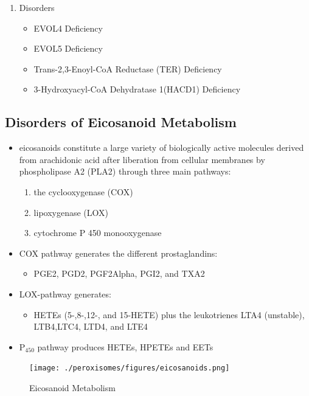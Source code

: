 \documentclass{scrartcl}
\begin{document}
\begin{enumerate}
\item Disorders
\label{sec:orgbee8424}
\begin{itemize}
\item EVOL4 Deficiency
\item EVOL5 Deficiency
\item Trans-2,3-Enoyl-CoA Reductase (TER) Deficiency
\item 3-Hydroxyacyl-CoA Dehydratase 1(HACD1) Deficiency
\end{itemize}
\end{enumerate}

\subsection{Disorders of Eicosanoid Metabolism}
\label{sec:org469e7ae}
\begin{itemize}
\item eicosanoids constitute a large variety of biologically active
molecules derived from arachidonic acid after liberation from
cellular membranes by phospholipase A2 (PLA2) through three main pathways:
\begin{enumerate}
\item the cyclooxygenase (COX)
\item lipoxygenase (LOX)
\item cytochrome P 450 monooxygenase
\end{enumerate}

\item COX pathway generates the different prostaglandins:
\begin{itemize}
\item PGE2, PGD2, PGF2Alpha, PGI2, and TXA2
\end{itemize}

\item LOX-pathway generates:
\begin{itemize}
\item HETEs (5-,8-,12-, and 15-HETE) plus the leukotrienes LTA4
(unstable), LTB4,LTC4, LTD4, and LTE4
\end{itemize}

\item P\(_{\text{450}}\) pathway produces HETEs, HPETEs and EETs
\end{itemize}

\begin{figure}[htbp]
\centering
\texttt{[image: ./peroxisomes/figures/eicosanoids.png]}
\caption{\label{fig:orga76267b}
Eicosanoid Metabolism}
\end{figure}
\end{document}
